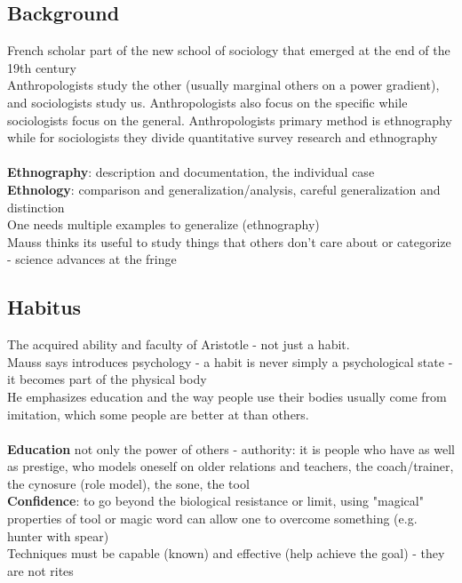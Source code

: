 \documentclass{article}
\begin{document}
\subsection{Background}
French scholar part of the new school of sociology that emerged at the end of the 19th century \\
Anthropologists study the other (usually marginal others on a power gradient), and sociologists study us. Anthropologists also focus on the specific while sociologists focus on the general. Anthropologists primary method is ethnography while for sociologists they divide quantitative survey research and ethnography \\ \\
\textbf{Ethnography}: description and documentation, the individual case \\ 
\textbf{Ethnology}: comparison and generalization/analysis, careful generalization and distinction \\
One needs multiple examples to generalize (ethnography) \\
Mauss thinks its useful to study things that others don't care about or categorize - science advances at the fringe 

\subsection{Habitus}
The acquired ability and faculty of Aristotle - not just a habit.  \\
Mauss says introduces psychology  - a habit is never simply a psychological state - it becomes part of the physical body \\
He emphasizes education and the way people use their bodies usually come from imitation, which some people are better at than others. \\ \\ 
\textbf{Education} not only the power of others - authority: it is people who have as well as prestige, who models oneself on older relations and teachers, the coach/trainer, the cynosure (role model), the sone, the tool \\ 
\textbf{Confidence}: to go beyond the biological resistance or limit, using "magical" properties of tool or magic word can allow one to overcome something (e.g. hunter with spear) \\
Techniques must be capable (known) and effective (help achieve the goal) - they are not rites 
\end{document}
